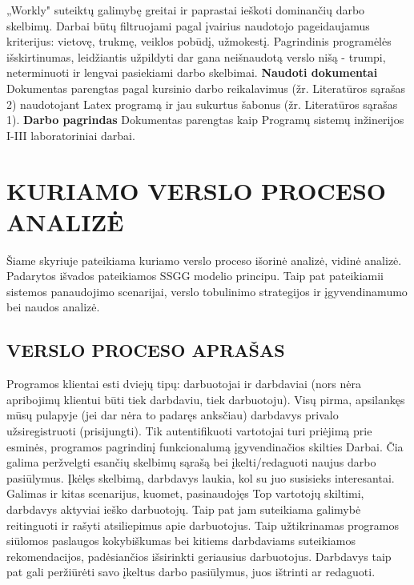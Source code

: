 \documentclass{VUMIFPSkursinis}
\begin{document}
„Workly" suteiktų galimybę greitai ir paprastai ieškoti dominančių darbo skelbimų. Darbai būtų filtruojami pagal įvairius naudotojo pageidaujamus kriterijus: vietovę, trukmę, veiklos pobūdį, užmokestį. Pagrindinis programėlės išskirtinumas, leidžiantis užpildyti dar gana neišnaudotą verslo nišą - trumpi, neterminuoti ir lengvai pasiekiami darbo skelbimai. 
\newline
\newline
\textbf{Naudoti dokumentai}
Dokumentas parengtas pagal kursinio darbo reikalavimus (žr. Literatūros sąrašas 2) naudotojant Latex programą ir jau sukurtus šabonus (žr. Literatūros sąrašas 1).
\newline
\newline
\textbf{Darbo pagrindas}
Dokumentas parengtas kaip Programų sistemų inžinerijos I-III laboratoriniai darbai.
\newpage
\section{KURIAMO VERSLO PROCESO ANALIZĖ}
Šiame skyriuje pateikiama kuriamo verslo proceso išorinė analizė, vidinė analizė. Padarytos išvados pateikiamos SSGG modelio principu. Taip pat pateikiamii sistemos panaudojimo scenarijai, verslo tobulinimo strategijos ir įgyvendinamumo bei naudos analizė.
\subsection{VERSLO PROCESO APRAŠAS}
Programos klientai esti dviejų tipų: darbuotojai ir darbdaviai (nors nėra apribojimų klientui būti tiek darbdaviu, tiek darbuotoju). Visų pirma, apsilankęs mūsų pulapyje (jei dar nėra to padaręs anksčiau) darbdavys privalo užsiregistruoti (prisijungti). Tik autentifikuoti vartotojai turi priėjimą prie esminės, programos pagrindinį funkcionalumą įgyvendinačios skilties Darbai. Čia galima peržvelgti esančių skelbimų sąrašą bei įkelti/redaguoti naujus darbo pasiūlymus. Įkėlęs skelbimą, darbdavys laukia, kol su juo susisieks interesantai. Galimas ir kitas scenarijus, kuomet, pasinaudojęs Top vartotojų skiltimi, darbdavys aktyviai ieško darbuotojų. Taip pat jam suteikiama galimybė reitinguoti ir rašyti atsiliepimus apie darbuotojus. Taip užtikrinamas programos siūlomos paslaugos kokybiškumas bei kitiems darbdaviams suteikiamos rekomendacijos, padėsiančios išsirinkti geriausius darbuotojus. Darbdavys taip pat gali peržiūrėti savo įkeltus darbo pasiūlymus, juos ištrinti ar redaguoti.
\end{document}
